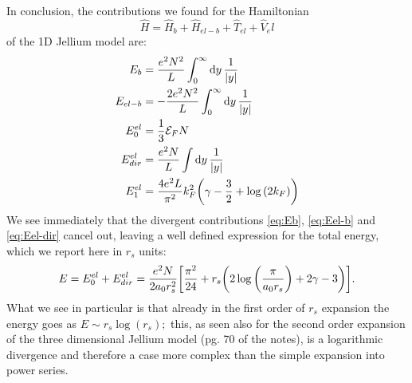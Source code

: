 \documentclass[a4paper]{article}
\begin{document}
\noindent In conclusion, the contributions we found for the Hamiltonian \[\hat{H} = \hat{H}_b + \hat{H}_{el-b} + \hat{T}_{el} + \hat{V}_el\] of the 1D Jellium model are:
\begin{align}
E_b &= \frac{e^2N^2}{L}\int_0^\infty \dd{y}\frac{1}{\abs{y}}\label{eq:Eb}\\
E_{el-b} &= -\frac{2e^2 N^2}{L}\int_{0}^\infty \dd{y}\frac{1}{\abs{y}}\label{eq:Eel-b}\\
E_0^{el} &= \frac{1}{3}\mathcal{E}_F N\\
E_{dir}^{el}&= \frac{e^2N}{L}\int \dd{y} \frac{1}{\abs{y}}\label{eq:Eel-dir}\\
E_1^{el} &= \frac{4e^2 L}{\pi^2} k_F^2 \pqty{\gamma-\frac{3}{2} +\log\pqty{2k_F}}
\end{align}
We see immediately that the divergent contributions \eqref{eq:Eb}, \eqref{eq:Eel-b} and \eqref{eq:Eel-dir} cancel out, leaving a well defined expression for the total energy, which we report here in $r_s$ units:
\begin{equation}
E = E_0^{el} + E_{dir}^{el} = \frac{e^2N}{2a_0 r_s^2}\bqty{\frac{\pi^2}{24} + r_s\pqty{2\log\pqty{\frac{\pi}{a_0r_s}}+ 2\gamma - 3}}.
\end{equation}
What we see in particular is that already in the first order of $r_s$ expansion the energy goes as $E\sim r_s \log(r_s);$ this, as seen also for the second order expansion of the three dimensional Jellium model (pg. 70 of the notes), is a logarithmic divergence and therefore a case more complex than the simple expansion into power series.
\end{document}
